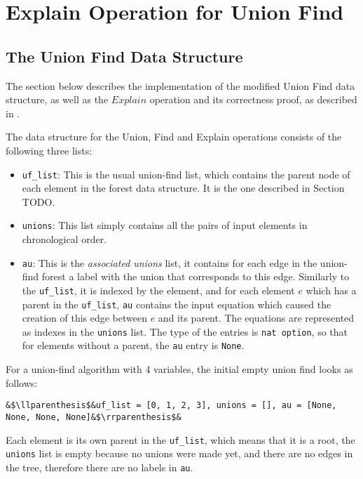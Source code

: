 
\chapter{Explain Operation for Union Find}\label{chapter:union_find}

\section{The Union Find Data Structure}


The section below describes the implementation of the modified Union Find data structure, as well as the $Explain$ operation and its correctness proof, as described in \cite{Nieuwenhuis}.

The data structure for the Union, Find and Explain operations consists of the following three lists:

\begin{itemize}
	\item \lstinline{uf_list}: This is the usual union-find list, which contains the parent node of each element in the forest data structure. It is the one described in Section TODO.

	\item \lstinline{unions}: This list simply contains all the pairs of input elements in chronological order.

	\item \lstinline{au}: This is the \emph{associated unions} list, it contains for each edge in the union-find forest a label with the union that corresponds to this edge. Similarly to the \lstinline{uf_list}, it is indexed by the element, and for each element $e$ which has a parent in the \lstinline{uf_list}, \lstinline{au} contains the input equation which caused the creation of this edge between $e$ and its parent. The equations are represented as indexes in the \lstinline{unions} list. The type of the entries is \lstinline{nat option}, so that for elements without a parent, the \lstinline{au} entry is \lstinline{None}.
\end{itemize}

\begin{exmp}\label{empty_ufe}
For a union-find algorithm with 4 variables, the initial empty union find looks as follows:
\begin{lstlisting}
&$\llparenthesis$&uf_list = [0, 1, 2, 3], unions = [], au = [None, None, None, None]&$\rrparenthesis$&
\end{lstlisting}
Each element is its own parent in the \lstinline{uf_list}, which means that it is a root, the \lstinline{unions} list is empty because no unions were made yet, and there are no edges in the tree, therefore there are no labels in \lstinline{au}.
\end{exmp}

